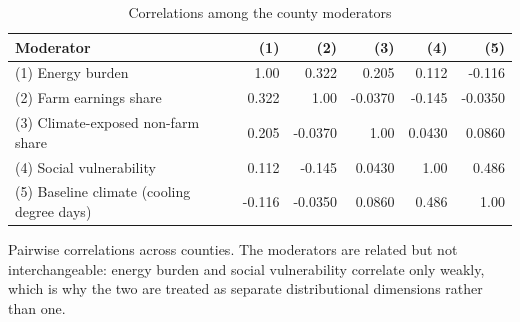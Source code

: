 \begin{table}[htbp]
\centering
\small
\setlength{\tabcolsep}{4pt}
\sloppy
\caption{Correlations among the county moderators}
\label{tab:e3t1}
\begin{tabularx}{\textwidth}{>{\raggedright\arraybackslash}X r r r r r}
\toprule
Moderator & (1) & (2) & (3) & (4) & (5) \\
\midrule
(1) Energy burden & 1.00 & 0.322 & 0.205 & 0.112 & -0.116 \\
(2) Farm earnings share & 0.322 & 1.00 & -0.0370 & -0.145 & -0.0350 \\
(3) Climate-exposed non-farm share & 0.205 & -0.0370 & 1.00 & 0.0430 & 0.0860 \\
(4) Social vulnerability & 0.112 & -0.145 & 0.0430 & 1.00 & 0.486 \\
(5) Baseline climate (cooling degree days) & -0.116 & -0.0350 & 0.0860 & 0.486 & 1.00 \\
\bottomrule
\end{tabularx}
\begin{minipage}{\textwidth}\vspace{0.5em}\footnotesize
Pairwise correlations across counties. The moderators are related but not interchangeable: energy burden and social vulnerability correlate only weakly, which is why the two are treated as separate distributional dimensions rather than one.
\end{minipage}
\end{table}
